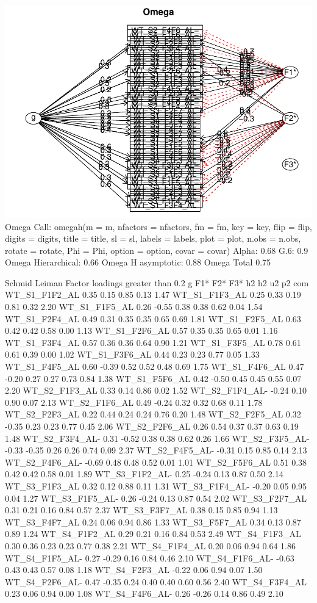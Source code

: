 \documentclass[
]{article}
\begin{document}
\includegraphics{expertise_2024_09_26_no_outlierdetection_MK_files/figure-latex/sjt_omega-1.pdf}
Omega Call: omegah(m = m, nfactors = nfactors, fm = fm, key = key, flip
= flip, digits = digits, title = title, sl = sl, labels = labels, plot =
plot, n.obs = n.obs, rotate = rotate, Phi = Phi, option = option, covar
= covar) Alpha: 0.68 G.6: 0.9 Omega Hierarchical: 0.66 Omega H
asymptotic: 0.88 Omega Total 0.75

Schmid Leiman Factor loadings greater than 0.2 g F1* F2* F3* h2 h2 u2 p2
com WT\_S1\_F1F2\_AL 0.35 0.15 0.85 0.13 1.47 WT\_S1\_F1F3\_AL 0.25 0.33
0.19 0.81 0.32 2.20 WT\_S1\_F1F5\_AL 0.26 -0.55 0.38 0.38 0.62 0.04 1.54
WT\_S1\_F2F4\_AL 0.49 0.31 0.35 0.35 0.65 0.69 1.81 WT\_S1\_F2F5\_AL
0.63 0.42 0.42 0.58 0.00 1.13 WT\_S1\_F2F6\_AL 0.57 0.35 0.35 0.65 0.01
1.16 WT\_S1\_F3F4\_AL 0.57 0.36 0.36 0.64 0.90 1.21 WT\_S1\_F3F5\_AL
0.78 0.61 0.61 0.39 0.00 1.02 WT\_S1\_F3F6\_AL 0.44 0.23 0.23 0.77 0.05
1.33 WT\_S1\_F4F5\_AL 0.60 -0.39 0.52 0.52 0.48 0.69 1.75
WT\_S1\_F4F6\_AL 0.47 -0.20 0.27 0.27 0.73 0.84 1.38 WT\_S1\_F5F6\_AL
0.42 -0.50 0.45 0.45 0.55 0.07 2.20 WT\_S2\_F1F3\_AL 0.33 0.14 0.86 0.02
1.52 WT\_S2\_F1F4\_AL- -0.24 0.10 0.90 0.07 2.13 WT\_S2\_F1F6\_AL 0.49
-0.24 0.32 0.32 0.68 0.11 1.78 WT\_S2\_F2F3\_AL 0.22 0.44 0.24 0.24 0.76
0.20 1.48 WT\_S2\_F2F5\_AL 0.32 -0.35 0.23 0.23 0.77 0.45 2.06
WT\_S2\_F2F6\_AL 0.26 0.54 0.37 0.37 0.63 0.19 1.48 WT\_S2\_F3F4\_AL-
0.31 -0.52 0.38 0.38 0.62 0.26 1.66 WT\_S2\_F3F5\_AL- -0.33 -0.35 0.26
0.26 0.74 0.09 2.37 WT\_S2\_F4F5\_AL- -0.31 0.15 0.85 0.14 2.13
WT\_S2\_F4F6\_AL- -0.69 0.48 0.48 0.52 0.01 1.01 WT\_S2\_F5F6\_AL 0.51
0.38 0.42 0.42 0.58 0.01 1.89 WT\_S3\_F1F2\_AL- 0.25 -0.24 0.13 0.87
0.50 2.14 WT\_S3\_F1F3\_AL 0.32 0.12 0.88 0.11 1.31 WT\_S3\_F1F4\_AL-
-0.20 0.05 0.95 0.04 1.27 WT\_S3\_F1F5\_AL- 0.26 -0.24 0.13 0.87 0.54
2.02 WT\_S3\_F2F7\_AL 0.31 0.21 0.16 0.84 0.57 2.37 WT\_S3\_F3F7\_AL
0.38 0.15 0.85 0.94 1.13 WT\_S3\_F4F7\_AL 0.24 0.06 0.94 0.86 1.33
WT\_S3\_F5F7\_AL 0.34 0.13 0.87 0.89 1.24 WT\_S4\_F1F2\_AL 0.29 0.21
0.16 0.84 0.53 2.49 WT\_S4\_F1F3\_AL 0.30 0.36 0.23 0.23 0.77 0.38 2.21
WT\_S4\_F1F4\_AL 0.20 0.06 0.94 0.64 1.86 WT\_S4\_F1F5\_AL- 0.27 -0.29
0.16 0.84 0.46 2.10 WT\_S4\_F1F6\_AL- -0.63 0.43 0.43 0.57 0.08 1.18
WT\_S4\_F2F3\_AL -0.22 0.06 0.94 0.07 1.50 WT\_S4\_F2F6\_AL- 0.47 -0.35
0.24 0.40 0.40 0.60 0.56 2.40 WT\_S4\_F3F4\_AL 0.23 0.06 0.94 0.00 1.08
WT\_S4\_F4F6\_AL- 0.26 -0.26 0.14 0.86 0.49 2.10
\end{document}
